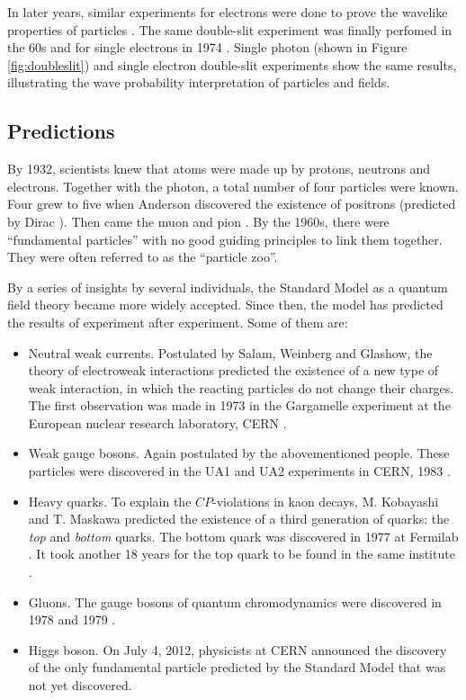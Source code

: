 In later years, similar experiments for electrons were done to prove the wavelike properties of particles \cite{Davisson:1927ta,thomson:1927}. The same double-slit experiment was finally perfomed in the 60s \cite{Jonsson1961} and for single electrons in 1974 \cite{merli:1974}. Single photon \cite{weiswynands:2003} (shown in Figure \ref{fig:doubleslit}) and single electron double-slit experiments show the same results, illustrating the wave probability interpretation of particles and fields.
\fi

\subsection{Predictions}
By 1932, scientists knew that atoms were made up by protons, neutrons and electrons. Together with the photon, a total number of four particles were known. Four grew to five when Anderson discovered the existence of positrons \cite{Anderson:1933mb} (predicted by Dirac \cite{Dirac:1928hu}). Then came the muon \cite{Neddermeyer:1937md} and pion \cite{Lattes:1947mw}. By the 1960s, there were ``fundamental particles'' with no good guiding principles to link them together. They were often referred to as the ``particle zoo''.

By a series of insights by several individuals, the Standard Model as a quantum field theory became more widely accepted. Since then, the model has predicted the results of experiment after experiment. Some of them are:

\vspace{2mm}

\begin{itemize}
\item Neutral weak currents. Postulated by Salam, Weinberg and Glashow, the theory of electroweak interactions predicted the existence of a new type of weak interaction, in which the reacting particles do not change their charges. The first observation was made in 1973 in the Gargamelle experiment at the European nuclear research laboratory, CERN \cite{Hasert:1973ff}.
\item Weak gauge bosons. Again postulated by the abovementioned people. These particles were discovered in the UA1 and UA2 experiments in CERN, 1983 \cite{Arnison:1983rp,Arnison:1983mk}.
\item Heavy quarks. To explain the $CP$-violations in kaon decays, M. Kobayashi and T. Maskawa predicted the existence of a third generation of quarks: the \textit{top} and \textit{bottom} quarks. The bottom quark was discovered in 1977 at Fermilab \cite{Herb:1977ek}. It took another 18 years for the top quark to be found in the same institute \cite{Abe:1995hr}. 
\item Gluons. The gauge bosons of quantum chromodynamics were discovered in 1978 and 1979 \cite{Barber:1979yr}.
\item Higgs boson. On July 4, 2012, physicists at CERN announced the discovery of the only fundamental particle predicted by the Standard Model that was not yet discovered. 
\end{itemize}  
